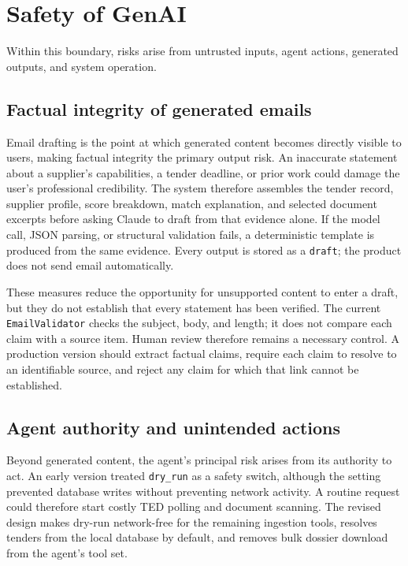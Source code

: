 \documentclass[10pt,a4paper]{article}
\begin{document}
\section{Safety of GenAI}

Within this boundary, risks arise from untrusted inputs, agent actions, generated outputs, and system operation.

\subsection{Factual integrity of generated emails}
Email drafting is the point at which generated content becomes directly visible to users, making factual integrity the primary output risk. An inaccurate statement about a supplier's capabilities, a tender deadline, or prior work could damage the user's professional credibility. The system therefore assembles the tender record, supplier profile, score breakdown, match explanation, and selected document excerpts before asking Claude to draft from that evidence alone. If the model call, JSON parsing, or structural validation fails, a deterministic template is produced from the same evidence. Every output is stored as a \texttt{draft}; the product does not send email automatically.

These measures reduce the opportunity for unsupported content to enter a draft, but they do not establish that every statement has been verified. The current \texttt{EmailValidator} checks the subject, body, and length; it does not compare each claim with a source item. Human review therefore remains a necessary control. A production version should extract factual claims, require each claim to resolve to an identifiable source, and reject any claim for which that link cannot be established.

\subsection{Agent authority and unintended actions}
Beyond generated content, the agent's principal risk arises from its authority to act. An early version treated \texttt{dry\_run} as a safety switch, although the setting prevented database writes without preventing network activity. A routine request could therefore start costly TED polling and document scanning. The revised design makes dry-run network-free for the remaining ingestion tools, resolves tenders from the local database by default, and removes bulk dossier download from the agent's tool set.
\end{document}
